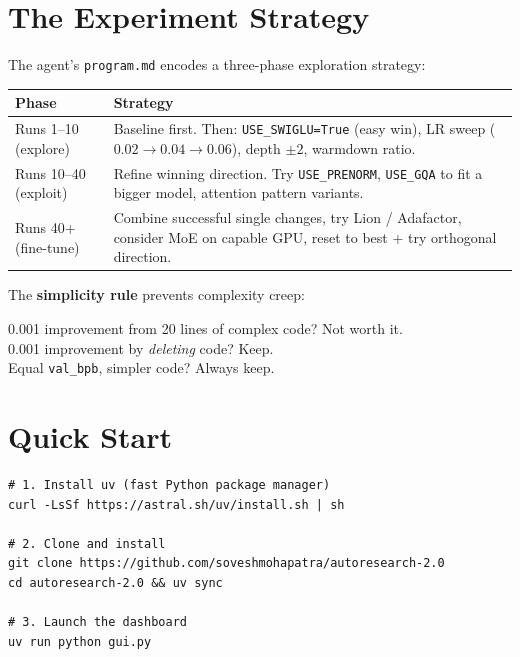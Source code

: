 \documentclass[12pt, a4paper]{article}
\newcommand{\bpb}{\texttt{val\_bpb}}
\newcommand{\file}[1]{\texttt{#1}}
\newcommand{\code}[1]{\texttt{#1}}
\begin{document}
\section{The Experiment Strategy}

The agent's \file{program.md} encodes a three-phase exploration strategy:

\begin{center}
\begin{tabular}{@{}lp{9cm}@{}}
\toprule
\textbf{Phase} & \textbf{Strategy} \\
\midrule
Runs 1--10 (explore)
& Baseline first. Then: \code{USE\_SWIGLU=True} (easy win), LR sweep
  ($0.02 \to 0.04 \to 0.06$), depth $\pm 2$, warmdown ratio. \\
Runs 10--40 (exploit)
& Refine winning direction. Try \code{USE\_PRENORM}, \code{USE\_GQA} to
  fit a bigger model, attention pattern variants. \\
Runs 40+ (fine-tune)
& Combine successful single changes, try Lion / Adafactor, consider
  MoE on capable GPU, reset to best + try orthogonal direction. \\
\bottomrule
\end{tabular}
\end{center}

The \textbf{simplicity rule} prevents complexity creep:

\begin{tcolorbox}[callout=green]
0.001 improvement from 20 lines of complex code? Not worth it.\\
0.001 improvement by \emph{deleting} code? Keep.\\
Equal \bpb{}, simpler code? Always keep.
\end{tcolorbox}

\section{Quick Start}

\begin{tcolorbox}[codebox, title=Get running in 3 commands]
\begin{lstlisting}[style=bashstyle]
# 1. Install uv (fast Python package manager)
curl -LsSf https://astral.sh/uv/install.sh | sh

# 2. Clone and install
git clone https://github.com/soveshmohapatra/autoresearch-2.0
cd autoresearch-2.0 && uv sync

# 3. Launch the dashboard
uv run python gui.py
\end{lstlisting}
\end{tcolorbox}
\end{document}
